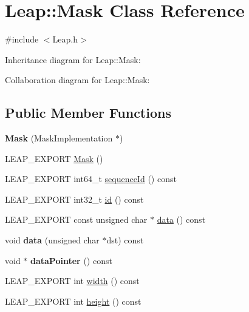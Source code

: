 \hypertarget{class_leap_1_1_mask}{}\section{Leap\+:\+:Mask Class Reference}
\label{class_leap_1_1_mask}


{\ttfamily \#include $<$Leap.\+h$>$}



Inheritance diagram for Leap\+:\+:Mask\+:


Collaboration diagram for Leap\+:\+:Mask\+:
\subsection*{Public Member Functions}
\begin{DoxyCompactItemize}
\item 
\mbox{\label{class_leap_1_1_mask_aa15e9b70a0ab3252ac257f007e0bfd35}} 
{\bfseries Mask} (Mask\+Implementation $\ast$)
\item 
L\+E\+A\+P\+\_\+\+E\+X\+P\+O\+RT \hyperlink{class_leap_1_1_mask_acc02d69baac946a67656212f7da5f146}{Mask} ()
\item 
L\+E\+A\+P\+\_\+\+E\+X\+P\+O\+RT int64\+\_\+t \hyperlink{class_leap_1_1_mask_af4a05e08d5b18f8b4bfd02d3ba249fc5}{sequence\+Id} () const
\item 
L\+E\+A\+P\+\_\+\+E\+X\+P\+O\+RT int32\+\_\+t \hyperlink{class_leap_1_1_mask_abc851fccb2981f034194506b9fee69c2}{id} () const
\item 
L\+E\+A\+P\+\_\+\+E\+X\+P\+O\+RT const unsigned char $\ast$ \hyperlink{class_leap_1_1_mask_abea2ed1fae02f57711c550a3729ea39f}{data} () const
\item 
\mbox{\label{class_leap_1_1_mask_a6fc60754da194b5d3840425388282f23}} 
void {\bfseries data} (unsigned char $\ast$dst) const
\item 
\mbox{\label{class_leap_1_1_mask_a23da195872ad61e3d4c33da09d20c3f7}} 
void $\ast$ {\bfseries data\+Pointer} () const
\item 
L\+E\+A\+P\+\_\+\+E\+X\+P\+O\+RT int \hyperlink{class_leap_1_1_mask_af452cfeac9999ea09b9a5277dcfc150f}{width} () const
\item 
L\+E\+A\+P\+\_\+\+E\+X\+P\+O\+RT int \hyperlink{class_leap_1_1_mask_a29f50a387a54fe4b54529b0afc0ce96d}{height} () const

\end{DoxyCompactItemize}
